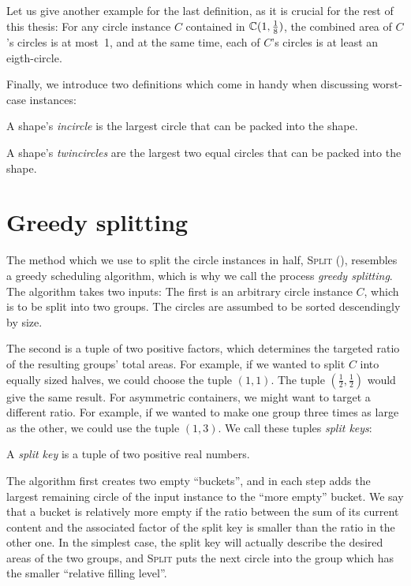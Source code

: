 \documentclass[a4paper,style=print,bibliography=totoc,nexus,lnum,extramargin]{tubsbook}
\begin{document}
Let us give another example for the last definition, as it is crucial for the rest of this thesis: For any circle instance $C$ contained in $\mathbb{C}(1,\frac{1}{8})$, the combined area of $C$'s circles is at most~1, and at the same time, each of $C$'s circles is at least an eigth-circle.

Finally, we introduce two definitions which come in handy when discussing worst-case instances:

\begin{definition}
    A shape's \emph{incircle} is the largest circle that can be packed into the shape.
\end{definition}

\begin{definition}
    A shape's \emph{twincircles} are the largest two equal circles that can be packed into the shape.%
\end{definition}


\section{Greedy splitting}

The method which we use to split the circle instances in half, \textsc{Split} (), resembles a greedy scheduling algorithm, which is why we call the process \emph{greedy splitting}. The algorithm takes two inputs: The first is an arbitrary circle instance $C$, which is to be split into two groups. The circles are assumbed to be sorted descendingly by size.

The second is a tuple of two positive factors, which determines the targeted ratio of the resulting groups' total areas. For example, if we wanted to split $C$ into equally sized halves, we could choose the tuple $(1,1)$. The tuple $(\frac 1 2,\frac 1 2)$ would give the same result.
For asymmetric containers, we might want to target a different ratio. For example, if we wanted to make one group three times as large as the other, we could use the tuple $(1,3)$. We call these tuples \emph{split keys}:

\begin{definition}
    A \emph{split key} is a tuple of two positive real numbers.
\end{definition}

The algorithm first creates two empty “buckets”, and in each step adds the largest remaining circle of the input instance to the “more empty” bucket. We say that a bucket is relatively more empty if the ratio between the sum of its current content and the associated factor of the split key is smaller than the ratio in the other one.
In the simplest case, the split key will actually describe the desired areas of the two groups, and \textsc{Split} puts the next circle into the group which has the smaller “relative filling level”.
\end{document}
